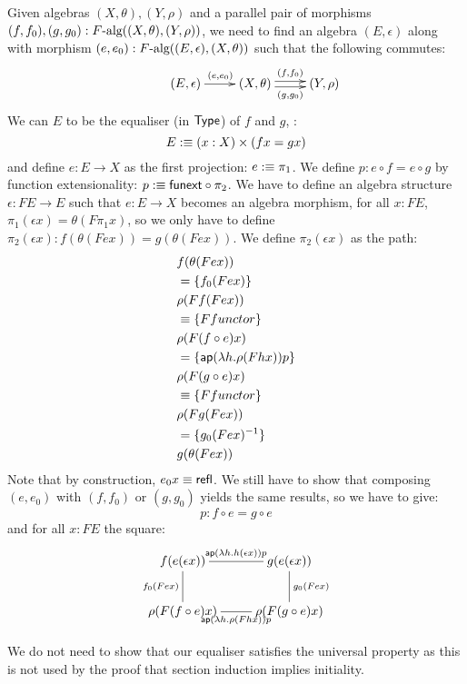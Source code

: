 \documentclass[a4paper,10pt]{article}
\begin{document}
Given algebras $(X,\theta), (Y,\rho)$ and a parallel pair of morphisms
$(f,f_0),(g,g_0) : F\mbox{-alg}((X,\theta),(Y,\rho))$, we need to find
an algebra $(E,\epsilon)$ along with morphism
$(e,e_0) : F\mbox{-alg}((E,\epsilon),(X,\theta))$ such that the
following commutes:
$$
\xymatrix{ &(E,\epsilon) \ar[r]^{(e,e_0)} &(X,\theta) \ar@<-.5ex>[r]_-{(g,g_0)}
  \ar@<.5ex>[r]^-{(f,f_0)} &(Y,\rho) }
$$
We can $E$ to be the equaliser (in $\mathsf{Type}$) of $f$ and $g$, \ie:
$$
E :\equiv (x : X) \times (f x = g x)
$$
and define $e : E \to X$ as the first projection: $e :\equiv \pi_1$.
We define $p : e \circ f = e \circ g$ by function extensionality:
$p :\equiv \mathsf{funext} \circ \pi_2$. We have to define an algebra
structure $\epsilon : FE \to E$ such that $e : E \to X$ becomes an
algebra morphism, \ie for all $x : FE$,
$\pi_1 (\epsilon x) = \theta (F \pi_1 x)$, so we only have to define
$\pi_2 (\epsilon x) : f (\theta (F e x)) = g (\theta (F e x))$. We
define $\pi_2 (\epsilon x)$ as the path:
%
\begin{align*}
  &f (\theta (F e x)) \\
  &= \{ f_0 (F e x) \} \\
  &\rho (F f (F e x)) \\
  &\equiv \{ F functor \} \\
  &\rho (F (f \circ e) x) \\
  &= \{ \mathsf{ap} (\lambda h . \rho (F h x)) p \} \\
  &\rho (F (g \circ e) x) \\
  &\equiv \{ F functor \} \\
  &\rho (F g (F e x)) \\
  &= \{ g_0 (F e x) ^{-1} \} \\
  &g (\theta (F e x))
\end{align*}
%
Note that by construction, $e_0 x \equiv \operatorname{\mathsf{refl}}$. We still have to show
that composing $(e,e_0)$ with $(f,f_0)$ or $(g,g_0)$ yields the same
results, so we have to give:
$$
p : f \circ e = g \circ e
$$
and for all $x : FE$ the square:
$$
\xymatrix{
f (e (\epsilon x)) 
  \ar@{-}[r]^{\ap (\lambda h . h (\epsilon x)) p} 
  \ar@{-}[d]_{f_0 (F e x)}  
&g (e (\epsilon x)) 
  \ar@{-}[d]^{g_0 (F e x)}
\\
\rho (F (f \circ e) x)
  \ar@{-}[r]_{\ap (\lambda h . \rho (F h x)) p}
&\rho (F (g \circ e) x)}
$$


We do not need to show that our equaliser satisfies the universal
property as this is not used by the proof that section induction
implies initiality.
\end{document}
